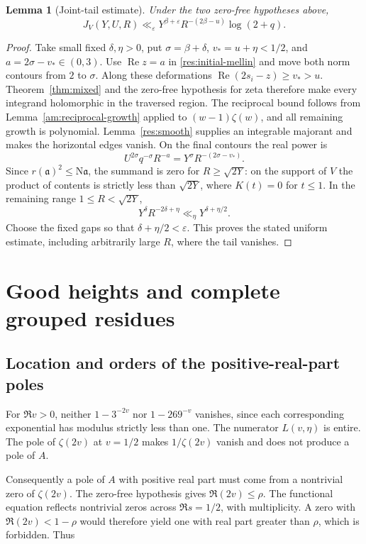 \documentclass[11pt]{article}
\numberwithin{equation}{section}
\newcommand{\N}{\mathrm N}
\newcommand{\Rea}{\operatorname{Re}}
\newtheorem{lemma}[theorem]{Lemma}
\begin{document}
\begin{lemma}[Joint-tail estimate]\label{res:oldtail}
Under the two zero-free hypotheses above,
\[
 J_V(Y,U,R)\ll_\varepsilon
 Y^{\beta+\varepsilon}R^{-(2\beta-u)}\log(2+q).
\]
\end{lemma}
\begin{proof}
Take small fixed \(\delta,\eta>0\), put
\(\sigma=\beta+\delta\), \(v_*=u+\eta<1/2\), and
\(a=2\sigma-v_*\in(0,3)\). Use \(\Rea z=a\) in
\eqref{res:initial-mellin} and move both norm contours from \(2\)
to \(\sigma\). Along these deformations
\(\Rea(2s_i-z)\geq v_*>u\).
Theorem~\ref{thm:mixed} and the zero-free hypothesis for zeta
therefore make every integrand holomorphic in the traversed region.
The reciprocal bound follows from
Lemma~\ref{am:reciprocal-growth} applied to
\((w-1)\zeta(w)\), and all remaining growth is polynomial.
Lemma~\ref{res:smooth} supplies an integrable majorant and makes
the horizontal edges vanish. On the final contours the real power is
\[
 U^{2\sigma}q^{-\sigma}R^{-a}
 =Y^\sigma R^{-(2\sigma-v_*)}.
\]
Since \(r(\mathfrak a)^2\leq\N\mathfrak a\), the summand is zero
for \(R\geq\sqrt{2Y}\): on the support of \(V\) the product of
contents is strictly less than \(\sqrt{2Y}\), where \(K(t)=0\)
for \(t\leq1\). In the remaining range \(1\leq R<\sqrt{2Y}\),
\[
 Y^\delta R^{-2\delta+\eta}\ll_\eta
 Y^{\delta+\eta/2}.
\]
Choose the fixed gaps so that \(\delta+\eta/2<\varepsilon\).
This proves the stated uniform estimate, including arbitrarily
large \(R\), where the tail vanishes.
\end{proof}


\section{Good heights and complete grouped
residues}\label{good-heights-and-complete-grouped-residues}

\subsection{Location and orders of the positive-real-part
poles}\label{location-and-orders-of-the-positive-real-part-poles}

For \(\Re v>0\), neither \(1-3^{-2v}\) nor \(1-269^{-v}\) vanishes,
since each corresponding exponential has modulus strictly less than one.
The numerator \(L(v,\eta)\) is entire. The pole of \(\zeta(2v)\) at
\(v=1/2\) makes \(1/\zeta(2v)\) vanish and does not produce a pole of
\(A\).

Consequently a pole of \(A\) with positive real part must come from a
nontrivial zero of \(\zeta(2v)\). The zero-free hypothesis gives
\(\Re(2v)\leq\rho\). The functional equation reflects nontrivial zeros
across \(\Re s=1/2\), with multiplicity. A zero with \(\Re(2v)<1-\rho\)
would therefore yield one with real part greater than \(\rho\), which is
forbidden. Thus
\end{document}
